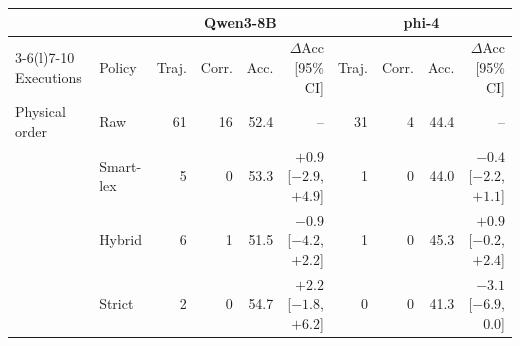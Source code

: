 \begin{tabular}{@{}ll rrrr rrrr@{}}
\toprule
 & & \multicolumn{4}{c}{Qwen3-8B} & \multicolumn{4}{c}{phi-4} \\
\cmidrule(lr){3-6}\cmidrule(l){7-10}
Executions & Policy & Traj. & Corr. & Acc. & $\Delta$Acc [95\% CI] & Traj. & Corr. & Acc. & $\Delta$Acc [95\% CI] \\
\midrule
Physical order & Raw & 61 & 16 & 52.4 & -- & 31 & 4 & 44.4 & -- \\
 & Smart-lex & 5 & 0 & 53.3 & $+0.9$ [$-2.9$, $+4.9$] & 1 & 0 & 44.0 & $-0.4$ [$-2.2$, $+1.1$] \\
 & Hybrid & 6 & 1 & 51.5 & $-0.9$ [$-4.2$, $+2.2$] & 1 & 0 & 45.3 & $+0.9$ [$-0.2$, $+2.4$] \\
 & Strict & 2 & 0 & 54.7 & $+2.2$ [$-1.8$, $+6.2$] & 0 & 0 & 41.3 & $-3.1$ [$-6.9$, $0.0$] \\
\bottomrule
\end{tabular}

